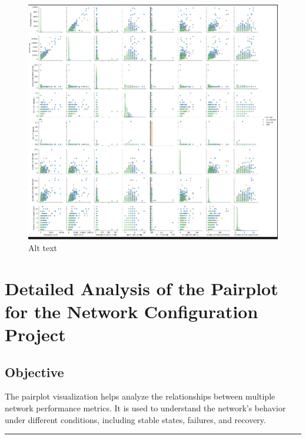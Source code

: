 \documentclass[11pt]{article}
\begin{document}
    \begin{figure}
\centering
\includegraphics{Screenshot from 2024-11-18 22-45-36.png}
\caption{Alt text}
\end{figure}

    \hypertarget{detailed-analysis-of-the-pairplot-for-the-network-configuration-project}{%
\section{\texorpdfstring{\textbf{Detailed Analysis of the Pairplot for
the Network Configuration
Project}}{Detailed Analysis of the Pairplot for the Network Configuration Project}}\label{detailed-analysis-of-the-pairplot-for-the-network-configuration-project}}

\hypertarget{objective}{%
\subsection{\texorpdfstring{\textbf{Objective}}{Objective}}\label{objective}}

The pairplot visualization helps analyze the relationships between
multiple network performance metrics. It is used to understand the
network's behavior under different conditions, including stable states,
failures, and recovery.

\begin{center}\rule{0.5\linewidth}{0.5pt}\end{center}
\end{document}
